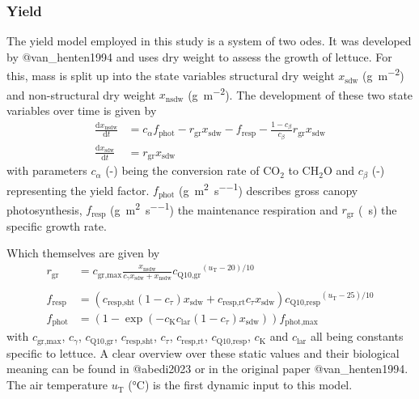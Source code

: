 \subsubsection{Yield}
\label{subsub:yield-model}
The yield model employed in this study is a system of two \acp{ode}.
It was developed by @van\_henten1994 and uses dry weight to assess the growth of lettuce.
For this, mass is split up into the state variables structural dry weight $x_{\text{sdw}}$ (\si{\g\per\square\m}) and non-structural dry weight $x_{\text{nsdw}}$ (\si{\g\per\square\m}).
The development of these two state variables over time is given by
\begin{align*}
  \frac{\mathrm{d}x_{\text{nsdw}}}{\mathrm{d}t} &= c_\alpha f_{\text{phot}} - r_{\text{gr}} x_{\text{sdw}} - f_{\text{resp}} - \frac{1-c_\beta}{c_\beta} r_{\text{gr}} x_{\text{sdw}}\\
  \frac{\mathrm{d}x_{\text{sdw}}}{\mathrm{d}t} &= r_{\text{gr}} x_{\text{sdw}}
\end{align*}
with parameters $c_\alpha$ (-) being the conversion rate of CO$_2$ to CH$_2$O and $c_\beta$ (-) representing the yield factor.
$f_{\text{phot}}$ (\si{\g\per\square\m\per\s}) describes gross canopy photosynthesis, $f_{\text{resp}}$ (\si{\g\per\square\m\per\s}) the maintenance respiration and $r_{\text{gr}}$ (\si{\per\s}) the specific growth rate.

Which themselves are given by
\begin{align*}
  r_{\text{gr}} &= c_{\text{gr,max}} \frac{x_{\text{nsdw}}}{c_\gamma x_{\text{sdw}} + x_{\text{nsdw}}} {c_{\text{Q10,gr}}}^{(u_\text{T}-20)/10}\\
  \\
  f_{\text{resp}} &= (c_{\text{resp,sht}}(1-c_\tau)x_{\text{sdw}}+c_{\text{resp,rt}}c_\tau x_{\text{sdw}}) {c_{\text{Q10,resp}}}^{(u_\text{T}-25)/10}\\
  f_{\text{phot}} &= (1-\exp(-c_\text{K} c_{\text{lar}} (1-c_\tau) x_{\text{sdw}})) f_{\text{phot,max}}
\end{align*}
with $c_{\text{gr,max}}$, $c_\gamma$, $c_{\text{Q10,gr}}$, $c_{\text{resp,sht}}$, $c_\tau$, $c_{\text{resp,rt}}$, $c_{\text{Q10,resp}}$, $c_\text{K}$ and $c_{\text{lar}}$ all being constants specific to lettuce.
A clear overview over these static values and their biological meaning can be found in @abedi2023 or in the original paper @van\_henten1994.
The air temperature $u_\text{T}$ (\si{\degreeCelsius}) is the first dynamic input to this model.

